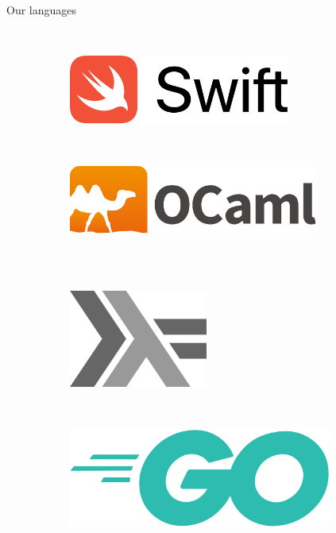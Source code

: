 \documentclass[NET,english,aspectratio=169,notitleframe]{tumbeamer}
\begin{document}
\begin{frame}{Our languages}
\begin{figure}
    \centering

    \begin{subfigure}[t]{0.2\textwidth}
        \centering
    \end{subfigure}
    ~ 
    \begin{subfigure}[t]{0.3\textwidth}
        \centering
        \includegraphics[width=0.8\textwidth]{pics/swift}
    \end{subfigure}
    ~ 
    \begin{subfigure}[t]{0.3\textwidth}
        \centering
        \includegraphics[width=0.9\textwidth]{pics/ocaml}
    \end{subfigure}
    \\
    \vspace{2.5em}
    \centering
    ~ 
    \begin{subfigure}[t]{0.2\columnwidth}
        \centering
        \includegraphics[width=0.5\textwidth]{pics/haskell}
    \end{subfigure}
    ~ 
    \begin{subfigure}[t]{0.2\columnwidth}
        \centering
        \includegraphics[width=0.95\textwidth]{pics/go}

\end{subfigure}
\end{figure}
\end{frame}
\end{document}

